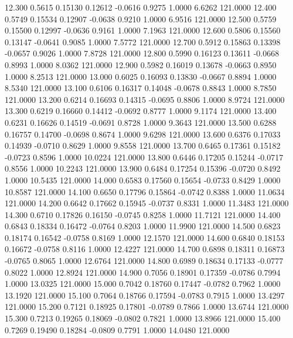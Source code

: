   12.300   0.5615   0.15130   0.12612  -0.0616   0.9275   1.0000   6.6262 121.0000
  12.400   0.5749   0.15534   0.12907  -0.0638   0.9210   1.0000   6.9516 121.0000
  12.500   0.5759   0.15500   0.12997  -0.0636   0.9161   1.0000   7.1963 121.0000
  12.600   0.5806   0.15560   0.13147  -0.0641   0.9085   1.0000   7.5772 121.0000
  12.700   0.5912   0.15863   0.13398  -0.0657   0.9026   1.0000   7.8728 121.0000
  12.800   0.5990   0.16123   0.13611  -0.0668   0.8993   1.0000   8.0362 121.0000
  12.900   0.5982   0.16019   0.13678  -0.0663   0.8950   1.0000   8.2513 121.0000
  13.000   0.6025   0.16093   0.13830  -0.0667   0.8894   1.0000   8.5340 121.0000
  13.100   0.6106   0.16317   0.14048  -0.0678   0.8843   1.0000   8.7850 121.0000
  13.200   0.6214   0.16693   0.14315  -0.0695   0.8806   1.0000   8.9724 121.0000
  13.300   0.6219   0.16660   0.14412  -0.0692   0.8777   1.0000   9.1174 121.0000
  13.400   0.6231   0.16626   0.14519  -0.0691   0.8728   1.0000   9.3643 121.0000
  13.500   0.6288   0.16757   0.14700  -0.0698   0.8674   1.0000   9.6298 121.0000
  13.600   0.6376   0.17033   0.14939  -0.0710   0.8629   1.0000   9.8558 121.0000
  13.700   0.6465   0.17361   0.15182  -0.0723   0.8596   1.0000  10.0224 121.0000
  13.800   0.6446   0.17205   0.15244  -0.0717   0.8556   1.0000  10.2243 121.0000
  13.900   0.6484   0.17254   0.15396  -0.0720   0.8492   1.0000  10.5435 121.0000
  14.000   0.6583   0.17560   0.15654  -0.0733   0.8429   1.0000  10.8587 121.0000
  14.100   0.6650   0.17796   0.15864  -0.0742   0.8388   1.0000  11.0634 121.0000
  14.200   0.6642   0.17662   0.15945  -0.0737   0.8331   1.0000  11.3483 121.0000
  14.300   0.6710   0.17826   0.16150  -0.0745   0.8258   1.0000  11.7121 121.0000
  14.400   0.6843   0.18334   0.16472  -0.0764   0.8203   1.0000  11.9900 121.0000
  14.500   0.6823   0.18174   0.16542  -0.0758   0.8169   1.0000  12.1570 121.0000
  14.600   0.6840   0.18153   0.16672  -0.0758   0.8116   1.0000  12.4227 121.0000
  14.700   0.6898   0.18311   0.16873  -0.0765   0.8065   1.0000  12.6764 121.0000
  14.800   0.6989   0.18634   0.17133  -0.0777   0.8022   1.0000  12.8924 121.0000
  14.900   0.7056   0.18901   0.17359  -0.0786   0.7994   1.0000  13.0325 121.0000
  15.000   0.7042   0.18760   0.17447  -0.0782   0.7962   1.0000  13.1920 121.0000
  15.100   0.7064   0.18766   0.17594  -0.0783   0.7915   1.0000  13.4297 121.0000
  15.200   0.7121   0.18925   0.17801  -0.0789   0.7866   1.0000  13.6744 121.0000
  15.300   0.7213   0.19265   0.18069  -0.0802   0.7821   1.0000  13.8966 121.0000
  15.400   0.7269   0.19490   0.18284  -0.0809   0.7791   1.0000  14.0480 121.0000
